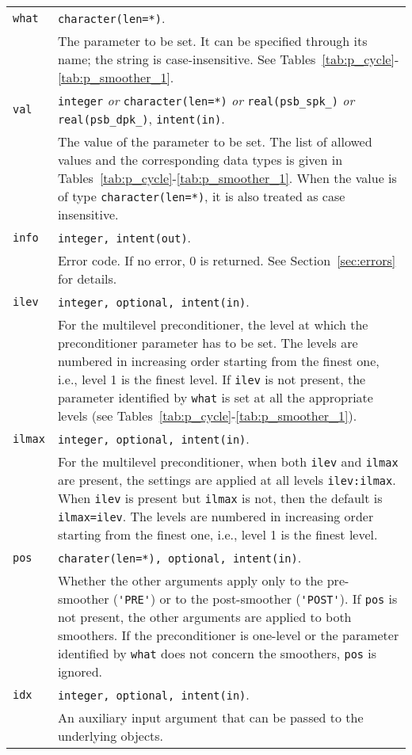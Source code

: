 \begin{tabular}{p{1.2cm}p{12cm}}
\verb|what|   & \verb|character(len=*)|. \\
              & The parameter to be set. It can be specified through its name;
                the string is case-insensitive. See
                Tables~\ref{tab:p_cycle}-\ref{tab:p_smoother_1}.\\
\verb|val |   & \verb|integer| \emph{or} \verb|character(len=*)| \emph{or}
                \verb|real(psb_spk_)| \emph{or} \verb|real(psb_dpk_)|,
                \verb|intent(in)|.\\
              & The value of the parameter to be set. The list of allowed
                values and the corresponding data types is given in
                Tables~\ref{tab:p_cycle}-\ref{tab:p_smoother_1}.
                When the value is of type \verb|character(len=*)|,
                it is also treated as case insensitive.\\
\verb|info|   & \verb|integer, intent(out)|.\\
              & Error code. If no error, 0 is returned. See Section~\ref{sec:errors}
                for details.\\
\verb|ilev|   & \verb|integer, optional, intent(in)|.\\
              & For the multilevel preconditioner, the level at which the
                preconditioner parameter has to be set.
                The levels are numbered in increasing
                order starting from the finest one, i.e., level 1 is the finest level.
                If \verb|ilev| is not present, the parameter identified by \verb|what|
                is set at all the appropriate levels (see
                Tables~\ref{tab:p_cycle}-\ref{tab:p_smoother_1}).\\
\verb|ilmax|   & \verb|integer, optional, intent(in)|.\\
              & For the multilevel preconditioner, when both
                \verb|ilev| and \verb|ilmax| are present, the settings
                are applied at all levels \verb|ilev:ilmax|. When
                \verb|ilev| is present but \verb|ilmax| is not, then
                the default is \verb|ilmax=ilev|.
                The levels are numbered in increasing
                order starting from the finest one, i.e., level 1 is the finest level. \\
\verb|pos|   & \verb|charater(len=*), optional, intent(in)|.\\
              & Whether the other arguments apply only to the pre-smoother (\verb|'PRE'|)
                or to the post-smoother (\verb|'POST'|). If \verb|pos| is not present,
                the other arguments are applied to both smoothers.
                If the preconditioner is one-level or the parameter identified by \verb|what|
                does not concern the smoothers, \verb|pos| is ignored.\\
\verb|idx|   & \verb|integer, optional, intent(in)|.\\
              & An auxiliary input argument that can be passed to the
                underlying objects.
\end{tabular}


